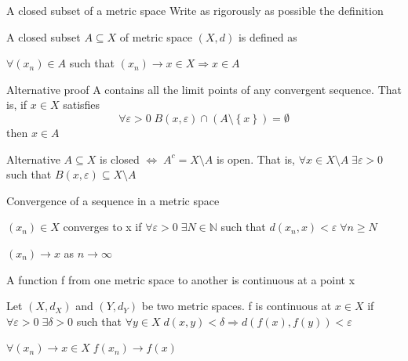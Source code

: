 \documentclass[a4paper,norsk]{article}
\renewcommand{\geq}{\geqslant}
\renewcommand{\epsilon}{\varepsilon}
\begin{document}
\begin{oppgavebox}{A closed subset of a metric space}{}
Write as rigorously as possible the definition

\begin{proofbox}{}{}
  A closed subset $ A \subseteq X $ of metric space $ \left( X, d \right)  $ is defined as 
  
  $ \forall \left( x_n \right) \in A $ such that $ \left( x_n \right) \to x \in X \Rightarrow x \in A $
\end{proofbox}

\begin{proofbox}{Alternative proof}{}
  A contains all the limit points of any convergent sequence. That is, if $ x \in X $ satisfies
  \[
      \forall \epsilon > 0 \; B \left( x, \epsilon \right) \cap \left( A \setminus \left\{ x \right\}  \right)  = \emptyset
  \]
  then $ x \in A $ 
  
\end{proofbox}

\begin{proofbox}{Alternative}{}
  $ A \subseteq X $ is closed $ \iff \; A^c = X \setminus A $ is open. That is, $ \forall x \in X \setminus A \; \exists  \epsilon > 0 $ such that $ B \left( x, \epsilon \right) \subseteq X \setminus A  $  
\end{proofbox}
\end{oppgavebox}

\begin{oppgavebox}{Convergence of a sequence in a metric space}{}
\begin{proofbox}{}{}
  $ \left( x_n \right) \in X $ converges to x if $ \forall \epsilon > 0 \; \exists  N \in \mathbb{N} $  such that $ d \left( x_n, x \right) < \epsilon \; \forall n \geq N $ 
\end{proofbox}

\begin{proofbox}{}{}
  $ \left( x_n \right) \to x $ as $ n \to \infty $ 
\end{proofbox}
\end{oppgavebox}

\begin{oppgavebox}{A function f from one metric space to another is continuous at a point x}{}
\begin{proofbox}{}{}
  Let $ \left( X, d_X \right)  $ and $ \left( Y, d_Y \right)  $ be two metric spaces. f is continuous at $ x \in X $ if $ \forall \epsilon > 0 \; \exists \delta > 0  $ such that $ \forall y \in X \; d \left( x, y \right) < \delta \Rightarrow d \left( f(x), f(y) \right) < \epsilon $ 
\end{proofbox}

\begin{proofbox}{}{}
  $ \forall \left( x_n \right) \to x \in X \; f \left( x_n \right) \to f(x) $
\end{proofbox}
\end{oppgavebox}
\end{document}
